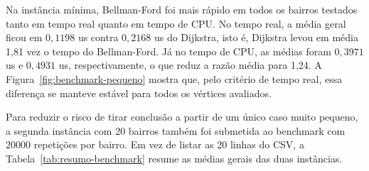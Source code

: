 \documentclass[12pt,a4paper]{article}
\begin{document}
Na instância mínima, Bellman-Ford foi mais rápido em todos os bairros testados
tanto em tempo real quanto em tempo de CPU. No tempo real, a média geral ficou
em $0{,}1198$ us contra $0{,}2168$ us do Dijkstra, isto é, Dijkstra levou em
média 1,81 vez o tempo do Bellman-Ford. Já no tempo de CPU, as médias foram
$0{,}3971$ us e $0{,}4931$ us, respectivamente, o que reduz a razão média para
1,24. A Figura~\ref{fig:benchmark-pequeno} mostra que, pelo critério de tempo
real, essa diferença se manteve estável para todos os vértices avaliados.

Para reduzir o risco de tirar conclusão a partir de um único caso muito
pequeno, a segunda instância com 20 bairros também foi submetida ao benchmark
com $20000$ repetições por bairro. Em vez de listar as 20 linhas do CSV, a
Tabela~\ref{tab:resumo-benchmark} resume as médias gerais das duas instâncias.

\begin{table}[h]
\centering
{}
\caption{Resumo das médias gerais dos benchmarks executados em tempo real e
tempo de CPU.}
\label{tab:resumo-benchmark}
\end{table}
\end{document}
